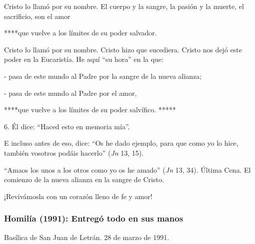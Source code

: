 			\begin{body}Cristo lo llamó por su nombre. El cuerpo y la sangre, la pasión y la muerte, el sacrificio, son el amor \end{body}
			
			\begin{body}****que vuelve a los límites de su poder salvador. \end{body}
			
			\begin{body}Cristo lo llamó por su nombre. Cristo hizo que sucediera. Cristo nos dejó este poder en la Eucaristía. He aquí “su hora” en la que: \end{body}
			
			\begin{body}- pasa de este mundo al Padre por la sangre de la nueva alianza; \end{body}
			
			\begin{body}- pasa de este mundo al Padre por el amor, \end{body}
			
			\begin{body}****que vuelve a los límites de su poder salvífico. *****\end{body}
			
			\begin{body}6. Él dice: “Haced esto en memoria mía”. \end{body}
			
			\begin{body}E incluso antes de eso, dice: “Os he dado ejemplo, para que como yo lo hice, también vosotros podáis hacerlo” (\textit{Jn }13, 15). \end{body}
			
			\begin{body} “Amaos los unos a los otros como yo os he amado” (\textit{Jn} 13, 34). Última Cena. El comienzo de la nueva alianza en la sangre de Cristo. \end{body}
			
			\begin{body}¡Revivámosla con un corazón lleno de fe y amor!\end{body}
			
			\subsubsection{Homilía (1991): Entregó todo en sus manos}
			
			\begin{referencia}Basílica de San Juan de Letrán. 28 de marzo de 1991.\end{referencia}
			
